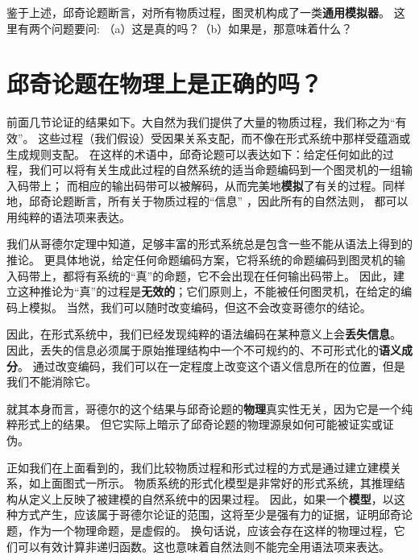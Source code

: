 \documentclass[a4paper,12pt]{article}
\begin{document}
鉴于上述，\gls{邱奇论题}断言，对所有\gls{物质过程}，\gls{图灵机}构成了一类\textbf{\gls{通用模拟器}}。 这里有两个问题要问: （a）这是真的吗？（b）如果是，那意味着什么？

\section{邱奇论题在物理上是正确的吗？}

前面几节论证的结果如下。大自然为我们提供了大量的\gls{物质过程}，我们称之为“有效”。
这些过程（我们假设）受\gls{因果关系}支配，而不像在\gls{形式系统}中那样受\gls{蕴涵}或\gls{生成规则}支配。
在这样的术语中，\gls{邱奇论题}可以表达如下：给定任何如此的过程，我们可以将有关\gls{生成}此过程的自然系统的适当\gls{命题}\gls{编码}到一个\gls{图灵机}的一组输入码带上；
而相应的输出码带可以被\gls{解码}，从而完美地\textbf{\gls{模拟}}了有关的过程。同样地，\gls{邱奇论题}断言，所有关于\gls{物质过程}的“信息” ，因此所有的\gls{自然法则}，
都可以用纯粹的\gls{语法项}来表达。

我们从哥德尔定理中知道，足够丰富的\gls{形式系统}总是包含一些不能从\gls{语法}上得到的推论。
更具体地说，给定任何\gls{命题}\gls{编码}方案，它将系统的\gls{命题}\gls{编码}到\gls{图灵机}的输入码带上，都将有系统的“真”的\gls{命题}，它不会出现在任何输出码带上。
因此，建立这种推论为“真”的过程是\textbf{无效的}；它们原则上，不能被任何\gls{图灵机}，在给定的编码上\gls{模拟}。
当然，我们可以随时改变\gls{编码}，但这不会改变哥德尔的结论。

因此，在\gls{形式系统}中，我们已经发现纯粹的\gls{语法编码}在某种意义上会\textbf{丢失信息}。
因此，丢失的信息必须属于原始\gls{推理结构}中一个不可规约的、不可\gls{形式化}的\textbf{\gls{语义成分}}。
通过改变\gls{编码}，我们可以在一定程度上改变这个\gls{语义信息}所在的位置，但是我们不能消除它。

就其本身而言，哥德尔的这个结果与\gls{邱奇论题}的\textbf{物理}真实性无关，因为它是一个纯粹形式上的结果。
但它实际上暗示了\gls{邱奇论题}的物理源泉如何可能被证实或证伪。

正如我们在上面看到的，我们比较\gls{物质过程}和\gls{形式过程}的方式是通过建立\gls{建模关系}，如上面图式一所示。
\gls{物质系统}的\gls{形式化}\gls{模型}是非常好的\gls{形式系统}，其\gls{推理结构}从定义上反映了被建模的自然系统中的\gls{因果过程}。
因此，如果一个\textbf{\gls{模型}}，以这种方式产生，应该属于哥德尔论证的范围，这将至少是强有力的证据，证明\gls{邱奇论题}，作为一个\gls{物理命题}，是虚假的。
换句话说，应该会存在这样的物理过程，它们可以有效计算非递归函数。这也意味着\gls{自然法则}不能完全用\gls{语法项}来表达。
\end{document}
